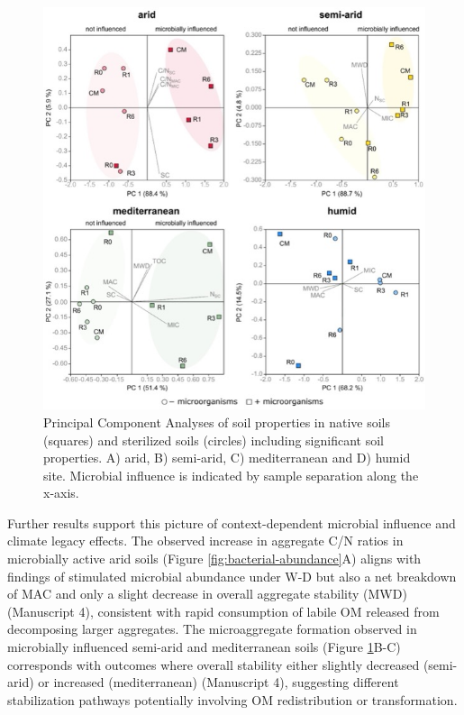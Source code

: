 \begin{figure}[h!]
	\centering
	\includegraphics[width=1\textwidth]{img/PCA-microbes-structure.jpg}
	\caption{Principal Component Analyses of soil properties in native soils (squares) and sterilized soils (circles) including significant soil properties. A) arid, B) semi-arid, C) mediterranean and D) humid site. Microbial influence is indicated by sample separation along the x-axis.}
	\label{fig:PCA-microbes}
\end{figure}

\FloatBarrier

Further results support this picture of context-dependent microbial influence and climate legacy effects. The observed increase in aggregate C/N ratios in microbially active arid soils (Figure \ref{fig:bacterial-abundance}A) aligns with findings of stimulated microbial abundance under W-D but also a net breakdown of MAC and only a slight decrease in overall aggregate stability (MWD) (Manuscript 4), consistent with rapid consumption of labile OM released from decomposing larger aggregates. The microaggregate formation observed in microbially influenced semi-arid and mediterranean soils (Figure \ref{fig:PCA-microbes}B-C) corresponds with outcomes where overall stability either slightly decreased (semi-arid) or increased (mediterranean) (Manuscript 4), suggesting different stabilization pathways potentially involving OM redistribution or transformation.

